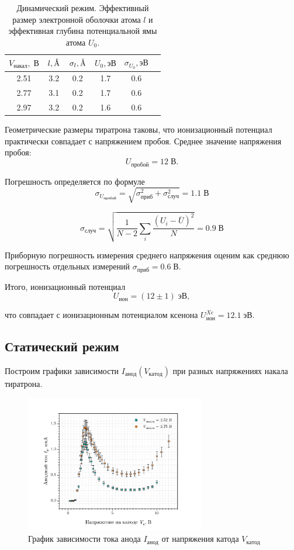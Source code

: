\documentclass[a4paper, 12pt]{article}
\newcommand{\angstrom}{\text{\normalfont\AA}}
\newcommand{\V}{\; В}
\begin{document}
    \begin{table}[H]
    \centering
    \begin{tabular}{c c c c c c }
        \toprule
        $V_{\text{накал}}, \V$ & $l, \angstrom$ & $\sigma_l, \angstrom$ & $U_0, \text{эВ}$ & $\sigma_{U_0}, \text{эВ}$ \\ \midrule
        2.51 & 3.2 & 0.2 & 1.7 & 0.6 \\
        2.77 & 3.1 & 0.2 & 1.7 & 0.6 \\
        2.97 & 3.2 & 0.2 & 1.6 & 0.6 \\ 
        \toprule
    \end{tabular}
    \caption{Динамический режим. Эффективный размер электронной оболочки атома $l$ и эффективная глубина потенциальной ямы атома $U_0$.}
    \label{table:atom}
    \end{table}

    Геометрические размеры тиратрона таковы, что ионизационный потенциал практически совпадает с напряжением пробоя. Среднее значение напряжения пробоя: \\
    $$
    U_\text{пробой} = 12 \V.
    $$
    
    Погрешность определяется по формуле
    $$
    \sigma_{U_{пробой}} = \sqrt{\sigma_{приб}^2 + \sigma_{случ}^2} = 1.1 \V
    $$
    
    $$
    \sigma_{случ} = \sqrt{\frac{1}{N - 2}\sum_i \frac{\left(U_i - \overline{U}\right)^2}{N}} = 0.9 \V
    $$
	
    Приборную погрешность измерения среднего напряжения оценим как среднюю погрешность отдельных измерений $\sigma_{приб} = 0.6 \V$.
	
    Итого, ионизационный потенциал
    $$
    U_{ион} = \left( 12 \pm 1 \right) \; эВ,
    $$
    
    что совпадает с ионизационным потенциалом ксенона $U_{ион}^{Xe} = 12.1 \; эВ$.

    \subsection{Статический режим}

    Построим графики зависимости $I_{анод}(V_{катод})$ при разных напряжениях накала тиратрона.

    \begin{figure}[H]
        \centering
        \includegraphics[width = 0.7\textwidth]{images/graph_VAC.png}
        \caption{График зависимости тока анода $I_{анод}$ от напряжения катода $V_{катод}$}
    \end{figure}
	
\end{document}
